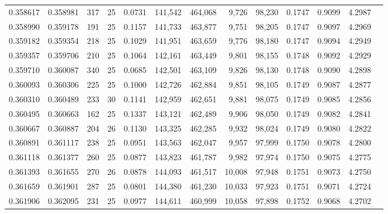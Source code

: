 \begin{tabular}{rrrrrrrrrrrrr}
0.358617 & 0.358981 & 317 &  25 &                                     0.0731 & 141,542 & 464,068 &   9,726 &  98,230 & 0.1747 & 0.9099 & 4.2987 \\
0.358990 & 0.359178 & 191 &  25 &                                     0.1157 & 141,733 & 463,877 &   9,751 &  98,205 & 0.1747 & 0.9097 & 4.2969 \\
0.359182 & 0.359354 & 218 &  25 &                                     0.1029 & 141,951 & 463,659 &   9,776 &  98,180 & 0.1747 & 0.9094 & 4.2949 \\
0.359357 & 0.359706 & 210 &  25 &                                     0.1064 & 142,161 & 463,449 &   9,801 &  98,155 & 0.1748 & 0.9092 & 4.2929 \\
0.359710 & 0.360087 & 340 &  25 &                                     0.0685 & 142,501 & 463,109 &   9,826 &  98,130 & 0.1748 & 0.9090 & 4.2898 \\
0.360093 & 0.360306 & 225 &  25 &                                     0.1000 & 142,726 & 462,884 &   9,851 &  98,105 & 0.1749 & 0.9087 & 4.2877 \\
0.360310 & 0.360489 & 233 &  30 &                                     0.1141 & 142,959 & 462,651 &   9,881 &  98,075 & 0.1749 & 0.9085 & 4.2856 \\
0.360495 & 0.360663 & 162 &  25 &                                     0.1337 & 143,121 & 462,489 &   9,906 &  98,050 & 0.1749 & 0.9082 & 4.2841 \\
0.360667 & 0.360887 & 204 &  26 &                                     0.1130 & 143,325 & 462,285 &   9,932 &  98,024 & 0.1749 & 0.9080 & 4.2822 \\
0.360891 & 0.361117 & 238 &  25 &                                     0.0951 & 143,563 & 462,047 &   9,957 &  97,999 & 0.1750 & 0.9078 & 4.2800 \\
0.361118 & 0.361377 & 260 &  25 &                                     0.0877 & 143,823 & 461,787 &   9,982 &  97,974 & 0.1750 & 0.9075 & 4.2775 \\
0.361393 & 0.361655 & 270 &  26 &                                     0.0878 & 144,093 & 461,517 &  10,008 &  97,948 & 0.1751 & 0.9073 & 4.2750 \\
0.361659 & 0.361901 & 287 &  25 &                                     0.0801 & 144,380 & 461,230 &  10,033 &  97,923 & 0.1751 & 0.9071 & 4.2724 \\
0.361906 & 0.362095 & 231 &  25 &                                     0.0977 & 144,611 & 460,999 &  10,058 &  97,898 & 0.1752 & 0.9068 & 4.2702 \\

\end{tabular}
